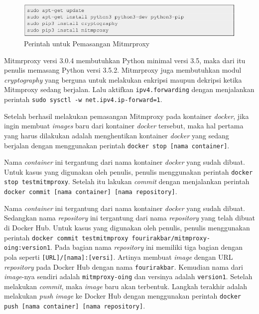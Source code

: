 \begin{figure}[H]
	\centering
	\includegraphics[width=\linewidth]{images/bab4/installmitmproxy}
	\caption{Perintah untuk Pemasangan Mitmrproxy}
	\label{installmitmproxy}
\end{figure}

Mitmrproxy versi 3.0.4 membutuhkan Python minimal versi 3.5, maka dari itu penulis memasang Python versi 3.5.2. Mitmrproxy juga membutuhkan modul \textit{cryptography} yang berguna untuk melakukan enkripsi maupun dekripsi ketika Mitmproxy sedang berjalan. Lalu aktifkan \texttt{ipv4.forwarding} dengan menjalankan perintah \texttt{sudo sysctl -w net.ipv4.ip-forward=1}.

Setelah berhasil melakukan pemasangan Mitmproxy pada kontainer \textit{docker}, jika ingin membuat \textit{images} baru dari kontainer \textit{docker} tersebut, maka hal pertama yang harus dilakukan adalah menghentikan kontainer \textit{docker} yang sedang berjalan dengan menggunakan perintah \texttt{docker stop [nama container]}.

Nama \textit{container} ini tergantung dari nama kontainer \textit{docker} yang sudah dibuat. Untuk kasus yang digunakan oleh penulis, penulis menggunakan perintah \texttt{docker stop testmitmproxy}. Setelah itu lakukan \textit{commit} dengan menjalankan perintah \texttt{docker commit [nama container] [nama repository]}.

Nama \textit{container} ini tergantung dari nama kontainer \textit{docker} yang sudah dibuat. Sedangkan nama \textit{repository} ini tergantung dari nama \textit{repository} yang telah dibuat di Docker Hub. Untuk kasus yang digunakan oleh penulis, penulis menggunakan perintah \texttt{docker commit testmitmproxy fourirakbar/mitmproxy-oing:version1}. Pada bagian nama \textit{repository} ini memiliki tiga bagian dengan pola seperti \texttt{[URL]/[nama]:[versi]}. Artinya membuat \textit{image} dengan URL \textit{repository} pada Docker Hub dengan nama \texttt{fourirakbar}. Kemudian nama dari \textit{image}-nya sendiri adalah \texttt{mitmproxy-oing} dan versinya adalah \texttt{version1}. Setelah melakukan \textit{commit}, maka \textit{image} baru akan terbentuk. Langkah terakhir adalah melakukan \textit{push image} ke Docker Hub dengan menggunakan perintah \texttt{docker push [nama container] [nama repository]}.

